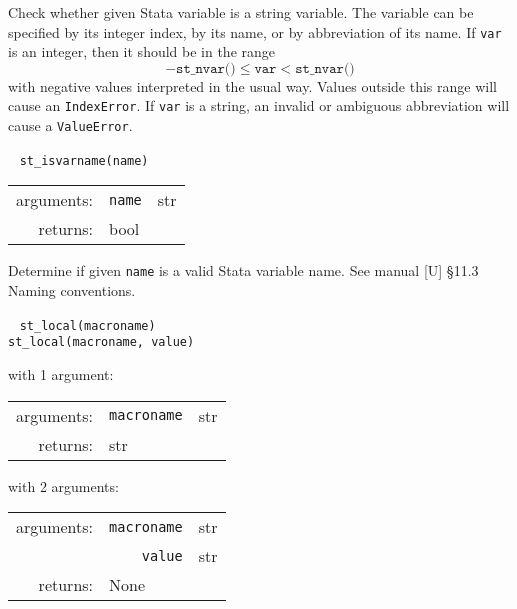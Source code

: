 \documentclass{article}
\begin{document}
			\vspace{1.5mm}
			\noindent Check whether given Stata variable is a string variable. The variable can be specified by its integer index, by its name, or by abbreviation of its name. If \lstinline{var} is an integer, then it should be in the range
			\[
				-\texttt{st\_nvar()} \leq \texttt{var} < \texttt{st\_nvar()}
			\]
			with negative values interpreted in the usual way. Values outside this range will cause an \lstinline{IndexError}. If \lstinline{var} is a string, an invalid or ambiguous abbreviation will cause a \lstinline{ValueError}. \newline
		
			
			\ \newline
			\noindent \lstinline$st_isvarname(name)$
								
			\vspace{1.5mm}
			\noindent 
			\indent \begin{tabular}{rrl}
					arguments: & \texttt{name} & str \\
					returns: & \multicolumn{2}{l}{bool}
				\end{tabular}
								
			\vspace{1.5mm}
			\noindent Determine if given \lstinline{name} is a valid Stata variable name. See manual [U] \S11.3 Naming conventions. \newline
			
			
			\ \newline
			\noindent \lstinline$st_local(macroname)$ \\
			\noindent \lstinline$st_local(macroname, value)$
								
			\vspace{1.5mm}
			\noindent 
			\indent with 1 argument:
			
			\indent \qquad \begin{tabular}{rrl}
					arguments: & \texttt{macroname} & str \\
					returns: & \multicolumn{2}{l}{str}
				\end{tabular}
								
			\vspace{1.5mm}
			\noindent
			\indent with 2 arguments:
			
			\indent \qquad \begin{tabular}{rrl}
					arguments: & \texttt{macroname} & str \\
					  & \texttt{value} & str \\
					returns: & \multicolumn{2}{l}{None}
				\end{tabular}
								
\end{document}
